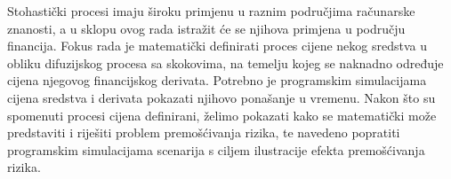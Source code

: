 \documentclass[times, utf8, diplomski]{fer}
\begin{document}
\begin{sazetak}
Stohastički procesi imaju široku primjenu u raznim područjima računarske znanosti, a u sklopu ovog rada istražit će se njihova primjena u području financija. Fokus rada je matematički definirati proces cijene nekog sredstva u obliku difuzijskog procesa sa skokovima, na temelju kojeg se naknadno određuje cijena njegovog financijskog derivata. Potrebno je programskim simulacijama cijena sredstva i derivata pokazati njihovo ponašanje u vremenu. Nakon što su spomenuti procesi cijena definirani, želimo pokazati kako se matematički može predstaviti i riješiti problem premošćivanja rizika, te navedeno popratiti programskim simulacijama scenarija s ciljem ilustracije efekta premošćivanja rizika.

\end{sazetak}
\end{document}
